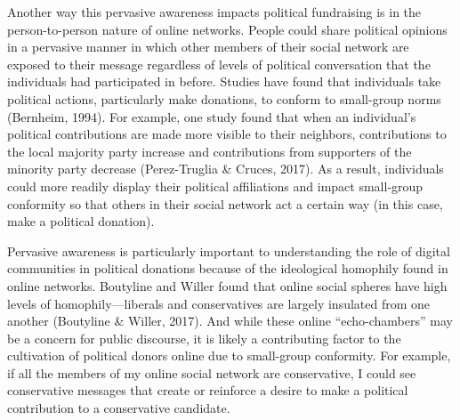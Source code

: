 \documentclass[12pt,]{article}
\begin{document}
Another way this pervasive awareness impacts political fundraising is in
the person-to-person nature of online networks. People could share
political opinions in a pervasive manner in which other members of their
social network are exposed to their message regardless of levels of
political conversation that the individuals had participated in before.
Studies have found that individuals take political actions, particularly
make donations, to conform to small-group norms (Bernheim, 1994). For
example, one study found that when an individual's political
contributions are made more visible to their neighbors, contributions to
the local majority party increase and contributions from supporters of
the minority party decrease (Perez-Truglia \& Cruces, 2017). As a
result, individuals could more readily display their political
affiliations and impact small-group conformity so that others in their
social network act a certain way (in this case, make a political
donation).

Pervasive awareness is particularly important to understanding the role
of digital communities in political donations because of the ideological
homophily found in online networks. Boutyline and Willer found that
online social spheres have high levels of homophily---liberals and
conservatives are largely insulated from one another (Boutyline \&
Willer, 2017). And while these online ``echo-chambers'' may be a concern
for public discourse, it is likely a contributing factor to the
cultivation of political donors online due to small-group conformity.
For example, if all the members of my online social network are
conservative, I could see conservative messages that create or reinforce
a desire to make a political contribution to a conservative candidate.
\end{document}
